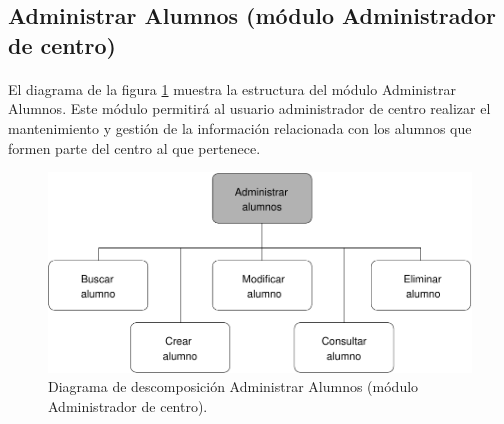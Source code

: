 \subsection{Administrar Alumnos (módulo Administrador de centro)}

  \paragraph{}El diagrama de la figura
  \ref{diagramaDescomposicionAdministrarAlumnos-admCentro} muestra la
  estructura del módulo Administrar Alumnos. Este módulo permitirá al usuario
  administrador de centro realizar el mantenimiento y gestión de la información
  relacionada con los alumnos que formen parte del centro al que pertenece.

  \begin{figure}[!ht]
    \begin{center}
      \includegraphics[]{11.Disenyo_Arquitectonico/11.2.Diagramas_Descomposicion/11.2.3.Modulo_administrador_centro/AdministrarBBDD/AdministrarUsuarios/AdministrarAlumnos/Diagramas/administrar_alumnos.pdf}
      \caption{Diagrama de descomposición Administrar Alumnos (módulo Administrador de centro).}
      \label{diagramaDescomposicionAdministrarAlumnos-admCentro}
    \end{center}
  \end{figure}
